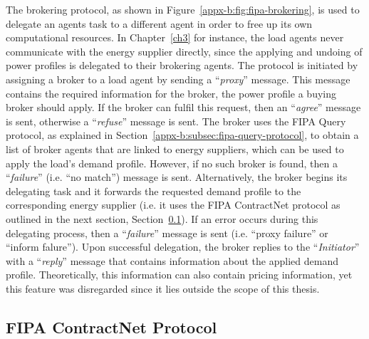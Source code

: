 

The brokering protocol, as shown in Figure~\ref{appx-b:fig:fipa-brokering}, is used to delegate an agents task to a different agent in order to free up its own computational resources.
In Chapter~\ref{ch3} for instance, the load agents never communicate with the energy supplier directly, since the applying and undoing of power profiles is delegated to their brokering agents.
The protocol is initiated by assigning a broker to a load agent by sending a ``\textit{proxy}'' message.
This message contains the required information for the broker,  the power profile a buying broker should apply.
If the broker can fulfil this request, then an ``\textit{agree}'' message is sent, otherwise a ``\textit{refuse}'' message is sent.
The broker uses the FIPA Query protocol, as explained in Section~\ref{appx-b:subsec:fipa-query-protocol}, to obtain a list of broker agents that are linked to energy suppliers, which can be used to apply the load's demand profile.
However, if no such broker is found, then a ``\textit{failure}'' (i.e. ``no match'') message is sent.
Alternatively, the broker begins its delegating task and it forwards the requested demand profile to the corresponding energy supplier (i.e. it uses the FIPA ContractNet protocol as outlined in the next section, Section~\ref{appx-b:subsec:fipa-contract-net-protocol}).
If an error occurs during this delegating process, then a ``\textit{failure}'' message is sent (i.e. ``proxy failure'' or ``inform falure'').
Upon successful delegation, the broker replies to the ``\textit{Initiator}'' with a ``\textit{reply}'' message that contains information about the applied demand profile.
Theoretically, this information can also contain pricing information, yet this feature was disregarded since it lies outside the scope of this thesis.

\subsection{FIPA ContractNet Protocol}
\label{appx-b:subsec:fipa-contract-net-protocol}



